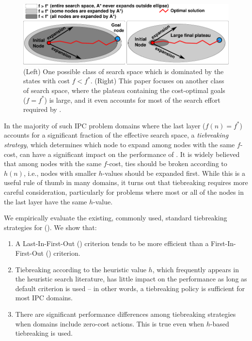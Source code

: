 \begin{figure}[htbp]
  \centering
  \includegraphics{img/astar/plateau-0.pdf}
 \caption{(Left) One possible class of search space which is dominated by the states with cost $f<f^*$. (Right) This paper focuses on another class of search space, where the plateau containing the cost-optimal goals ($f=f^*$) is large, and it even accounts for most of the search effort required by \astar. %
  }
 \label{fig:plateau-0}
\end{figure}

In the majority of such IPC problem domains where
the last layer ($f(n)=f^*$) accounts for a significant fraction of the effective search space, a
\emph{tiebreaking strategy}, which determines which node to expand among nodes with the same $f$-cost,
can have a significant impact on the performance of \astar.
It is widely believed that among nodes with the same $f$-cost,
ties should be broken according to $h(n)$, i.e.,
nodes with smaller $h$-values should be expanded first.  While this is a
useful rule of thumb in many domains, it turns out that tiebreaking
requires more careful consideration, particularly for problems where
most or all of the nodes in the last layer have the same $h$-value.

We empirically evaluate the existing, commonly used, standard
tiebreaking strategies for \astar ().
We show that:

\begin{enumerate}
 \item A Last-In-First-Out (\lifo) criterion tends to be more efficient
       than a First-In-First-Out (\fifo) criterion.
 \item Tiebreaking according to the heuristic value $h$, which
       frequently appears in the heuristic search literature, has little
       impact on the performance as long as \lifo default criterion is used 
       --  in other words, a \lifo tiebreaking policy is sufficient for most IPC domains.
 \item There are significant performance differences among tiebreaking strategies
       when domains include zero-cost actions. This is true even when $h$-based tiebreaking is used.
\end{enumerate}

